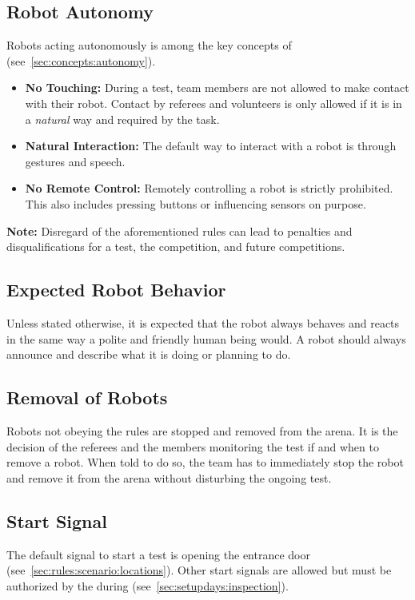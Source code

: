 \subsection{Robot Autonomy}
\label{sec:rules:autonomy}
Robots acting autonomously is among the key concepts of \AtHome{} (see~\ref{sec:concepts:autonomy}).
\begin{itemize}
	\item \textbf{No Touching:} During a test, team members are not allowed to make contact with their robot. Contact by referees and volunteers is only allowed if it is in a \textit{natural} way and required by the task.

	\item \textbf{Natural Interaction:} The default way to interact with a robot is through gestures and speech.

	\item \textbf{No Remote Control:} Remotely controlling a robot is strictly prohibited.
	This also includes pressing buttons or influencing sensors on purpose.
\end{itemize}

\noindent\textbf{Note:} Disregard of the aforementioned rules can lead to penalties and disqualifications for a test, the competition, and future competitions.

\subsection{Expected Robot Behavior}
\label{sec:rules:robotbehavior}
Unless stated otherwise, it is expected that the robot always behaves and reacts in the same way a polite and friendly human being would.
A robot should always announce and describe what it is doing or planning to do.

\subsection{Removal of Robots}
\label{sec:rules:robotremoval}
Robots not obeying the rules are stopped and removed from the arena. It is the decision of the referees and the  members monitoring the test if and when to remove a robot. When told to do so, the team has to immediately stop the robot and remove it from the arena without disturbing the ongoing test.


\subsection{Start Signal}
\label{sec:rules:startsignal}
The default signal to start a test is opening the entrance door (see~\ref{sec:rules:scenario:locations}).
Other start signals are allowed but must be authorized by the  during \RobotInspection{} (see~\ref{sec:setupdays:inspection}).

